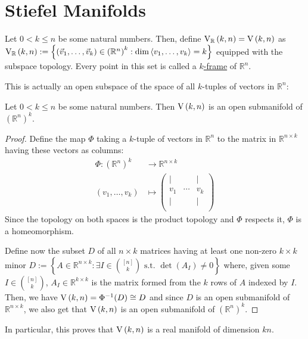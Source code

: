 \section{Stiefel Manifolds}
\begin{definition} Let $0<k\leq n$ be some natural numbers. Then, define $\St{k}{n}{\mathbb{R}}=\St{k}{n}$ as
$\St{k}{n}{\mathbb{R}}:=\left\{\left(\vec{v}_1,\ldots,\vec{v}_k\right)\in{\left(\mathbb{R}^n\right)}^k:\dim\left<v_1,\ldots,v_k\right>=k\right\}$
equipped with the subspace topology. Every point in this set is called a \ul{$k$-frame} of $\mathbb{R}^n$.
\end{definition}
This is actually an open subspace of the space of all $k$-tuples of vectors in $\mathbb{R}^n$:
\begin{proposition}\label{prop:St_open} Let $0<k\leq n$ be some natural numbers. Then $\St{k}{n}$ is an open submanifold of ${\left(\mathbb{R}^n\right)}^k$.
\end{proposition}
\begin{proof} Define the map $\Phi$ taking a $k$-tuple of vectors in $\mathbb{R}^n$ to the matrix in $\mathbb{R}^{n\times k}$ having these vectors as columns:
\begin{align*}
\Phi:{\left(\mathbb{R}^n\right)}^k&\to \mathbb{R}^{n\times k}\\[1em]
(v_1,\ldots,v_k)&\mapsto \left(\begin{array}{ccc}
|&&|\\[-.3em]
v_1&\cdots&v_k\\[-.3em]
|&&|\\
\end{array}\right)
\end{align*}
Since the topology on both spaces is the product topology and $\Phi$ respects it, $\Phi$ is a homeomorphism.

Define now the subset $D$ of all $n\times k$ matrices having at least one non-zero $k\times k$ minor
$D:=\left\{A\in\mathbb{R}^{n\times k}:\exists I\in\binom{[n]}{k}\text{ s.t. }\det(A_I)\neq0\right\}$
where, given some $I\in\binom{[n]}{k}$, $A_I\in\mathbb{R}^{k\times k}$ is the matrix formed from the $k$ rows of $A$ indexed by $I$. Then, we have
$\St{k}{n}=\Phi^{-1}(D)\cong D$
and since $D$ is an open submanifold of $\mathbb{R}^{n\times k}$, we also get that $\St{k}{n}$ is an open submanifold of ${\left(\mathbb{R}^n\right)}^k$.
\end{proof}
\begin{remark} In particular, this proves that $\St{k}{n}$ is a real manifold of dimension $kn$.
\end{remark}

